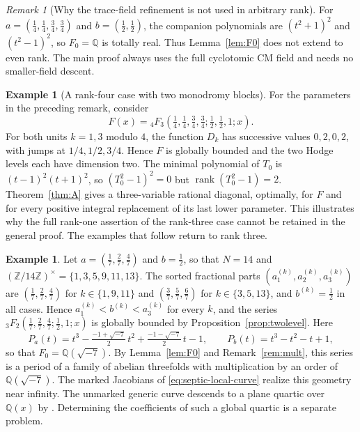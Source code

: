 \documentclass[11pt]{amsart}
\theoremstyle{definition}
\newtheorem{example}[theorem]{Example}
\theoremstyle{remark}
\newtheorem{remark}[theorem]{Remark}
\numberwithin{equation}{section}
\newcommand{\Q}{\mathbb{Q}}
\newcommand{\Z}{\mathbb{Z}}
\newcommand{\ak}[1]{a^{(k)}_{#1}}
\newcommand{\bk}{b^{(k)}}
\DeclareMathOperator{\rank}{rank}
\begin{document}
\begin{remark}[Why the trace-field refinement is not used in arbitrary rank]
For $a=(\frac14,\frac14,\frac34,\frac34)$ and $b=(\frac12,\frac12)$, the companion polynomials are $(t^2+1)^2$ and $(t^2-1)^2$, so $F_0=\Q$ is totally real. Thus Lemma~\ref{lem:F0} does not extend to even rank. The main proof always uses the full cyclotomic CM field and needs no smaller-field descent.
\end{remark}
\begin{example}[A rank-four case with two monodromy blocks]\label{ex:rankfour}
For the parameters in the preceding remark, consider
\[
F(x)={}_4F_3\left(\tfrac14,\tfrac14,\tfrac34,\tfrac34;
\tfrac12,\tfrac12,1;x\right).
\]
For both units $k=1,3$ modulo $4$, the function $D_k$ has successive values $0,2,0,2$, with jumps at $1/4,1/2,3/4$. Hence $F$ is globally bounded and the two Hodge levels each have dimension two. The minimal polynomial of $T_0$ is $(t-1)^2(t+1)^2$, so $(T_0^2-1)^2=0$ but $\rank(T_0^2-1)=2$. Theorem~\ref{thm:A} gives a three-variable rational diagonal, optimally, for $F$ and for every positive integral replacement of its last lower parameter. This illustrates why the full rank-one assertion of the rank-three case cannot be retained in the general proof. The examples that follow return to rank three.
\end{example}

\begin{example}\label{ex:seven}
Let $a=(\frac17,\frac27,\frac47)$ and $b=\frac12$, so that $N=14$ and $(\Z/14\Z)^\times=\{1,3,5,9,11,13\}$. The sorted fractional parts $(\ak1,\ak2,\ak3)$ are $(\frac17,\frac27,\frac47)$ for $k\in\{1,9,11\}$ and $(\frac37,\frac57,\frac67)$ for $k\in\{3,5,13\}$, and $\bk=\frac12$ in all cases. Hence $\ak1<\bk<\ak3$ for every $k$, and the series ${}_3F_2(\frac17,\frac27,\frac47;\frac12,1;x)$ is globally bounded by Proposition~\ref{prop:twolevel}. Here
\[
P_a(t)=t^3-\tfrac{-1+\sqrt{-7}}2\,t^2+\tfrac{-1-\sqrt{-7}}2\,t-1,\qquad P_b(t)=t^3-t^2-t+1,
\]
so that $F_0=\Q(\sqrt{-7})$. By Lemma~\ref{lem:F0} and Remark~\ref{rem:mult}, this series is a period of a family of abelian threefolds with multiplication by an order of $\Q(\sqrt{-7})$. The marked Jacobians of \eqref{eq:septic-local-curve} realize this geometry near infinity. The unmarked generic curve descends to a plane quartic over $\Q(x)$ by \citep[\S6]{SepticReconstruction}. Determining the coefficients of such a global quartic is a separate problem.
\end{example}
\end{document}
